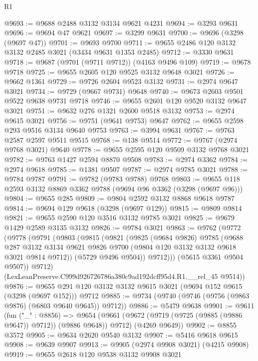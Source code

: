 \begin{lexlean}{R1}
\begin{coremodule}
@9693 := @9688 @2488 @3132 @3134 @9621 @4231
@9694 := @3293 @9631
@9696 := @9694 @47 @9621
@9697 := @3299 @9631
@9700 := @9696 (@3298 (@9697 @47))
@9701 := @9693 @9700
@9711 := @9655 @2486 @120 @3132 @3132 @2485 @3021 (@3434 @9631 @1353 @2485)
@9712 := @3330 @9631
@9718 := @9687 (@9701 (@9711 @9712)) (@4163 @9496 @109)
@9719 := @9678 @9718
@9725 := @9655 @2605 @120 @9525 @3132 @9648 @3021
@9726 := @9662 @1361
@9729 := @9726 @2604 @9523 @3132
@9731 := @2974 @9647 @3021
@9734 := @9729 (@9667 @9731) @9648
@9740 := @9673 @2603 @9501 @9522 @9638 @9731 @9718
@9746 := @9655 @2601 @120 @9520 @3132 @9647 @3021
@9751 := @9632 @276 @1321 @2600 @9518 @3132
@9753 := @2974 @9615 @3021
@9756 := @9751 (@9641 @9753) @9647
@9762 := @9655 @2598 @293 @9516 @3134 @9640 @9753
@9763 := @3994 @9631
@9767 := @9763 @2587 @2597 @9511 @9515
@9768 := @138 @9514
@9772 := @9767 (@2974 @9768 @3021) @9640
@9778 := @9655 @2595 @120 @9509 @3132 @9768 @3021
@9782 := @9763 @1427 @2594 @8870 @9508
@9783 := @2974 @3362
@9784 := @2974 @9618
@9785 := @1381 @9507
@9787 := @2974 @9785 @3021
@9788 := @9784 @9787
@9791 := @9782 (@9783 @9788) @9768
@9803 := @9655 @118 @2593 @3132 @8869 @3362 @9788 (@9694 @96 @3362 (@3298 (@9697 @96)))
@9804 := @9655 @285
@9809 := @9804 @2592 @3132 @8868 @9618 @9787
@9814 := @9694 @129 @9618 (@3298 (@9697 @129))
@9815 := @9809 @9814
@9821 := @9655 @2590 @120 @3516 @3132 @9785 @3021
@9825 := @9679 @1429 @2589 @3135 @3132
@9826 := @9784 @3021
@9863 := @9762
    (@9772
      (@9778
        (@9791
          (@9803
            (@9815
              (@9821
                (@9825
                  (@9684 @9826)
                  @9785
                  (@9688
                    @287
                    @3132
                    @3134
                    @9621
                    @9826
                    @9700
                    (@9804 @120 @3132 @3132 @9618 @3021 @9814 @9712))
                  (@5729 @9496 @9504))
                @9712)))
          (@5615 @3361 @9504 @9507))
        @9712)
      (LexLeanPreserve.C999d926726786a380c9ad192dcff95d4.R1.__rel_45 @9514))
@9876 := @9655 @291 @120 @3132 @3132 @9615 @3021 (@9694 @152 @9615 (@3298 (@9697 @152))) @9712
@9885 := @9734 (@9740 (@9746 (@9756 (@9863 @9876) (@6803 @9640 @9645)) @9712))
@9886 := @5479 @9638
@9901 := @9611
    (fun ("_" : @8856) =>
    @9654
      (@9661 (@9672 (@9719 (@9725 (@9885 (@9886 @9647)) @9712)) (@9886 @9648)) @9712)
      (@4269 @9649))
@9902 := @8855 @3572
@9905 := @9634 @2620 @9540 @3132
@9907 := @5416 @9618 @9615
@9908 := @9639 @9907
@9913 := @9905 (@2974 @9908 @3021) (@4215 @9908)
@9919 := @9655 @2618 @120 @9538 @3132 @9908 @3021

\end{coremodule}
\end{lexlean}
